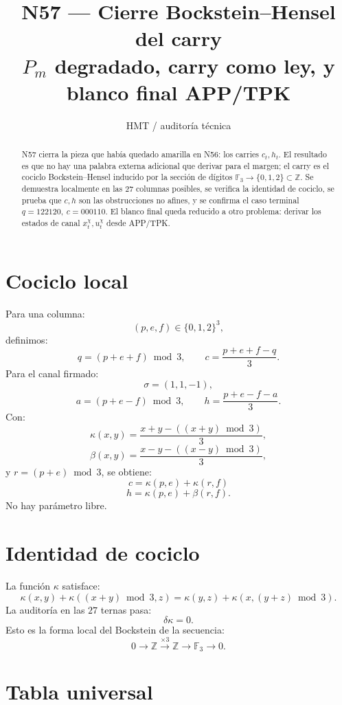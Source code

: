 \documentclass[11pt,a4paper]{article}
\title{\bfseries N57 --- Cierre Bockstein--Hensel del carry\\
\large \(P_m\) degradado, carry como ley, y blanco final APP/TPK}
\author{HMT / auditoría técnica}
\date{}
\begin{document}
\maketitle

\begin{abstract}
N57 cierra la pieza que había quedado amarilla en N56: los carries \(c_t,h_t\). El resultado es que no hay una palabra externa adicional que derivar para el margen; el carry es el cociclo Bockstein--Hensel inducido por la sección de dígitos \(\mathbb F_3\to\{0,1,2\}\subset\mathbb Z\). Se demuestra localmente en las \(27\) columnas posibles, se verifica la identidad de cociclo, se prueba que \(c,h\) son las obstrucciones no afines, y se confirma el caso terminal \(q=122120,\ c=000110\). El blanco final queda reducido a otro problema: derivar los estados de canal \(x_t^\chi,u_t^\chi\) desde APP/TPK.
\end{abstract}

\section{Cociclo local}

Para una columna:
\[
(p,e,f)\in\{0,1,2\}^3,
\]
definimos:
\[
q=(p+e+f)\bmod3,
\qquad
c=\frac{p+e+f-q}{3}.
\]
Para el canal firmado:
\[
\sigma=(1,1,-1),
\]
\[
a=(p+e-f)\bmod3,
\qquad
h=\frac{p+e-f-a}{3}.
\]
Con:
\[
\kappa(x,y)=\frac{x+y-((x+y)\bmod3)}{3},
\]
\[
\beta(x,y)=\frac{x-y-((x-y)\bmod3)}{3},
\]
y \(r=(p+e)\bmod3\), se obtiene:
\[
\boxed{
c=\kappa(p,e)+\kappa(r,f)
}
\]
\[
\boxed{
h=\kappa(p,e)+\beta(r,f).
}
\]
No hay parámetro libre.

\section{Identidad de cociclo}

La función \(\kappa\) satisface:
\[
\kappa(x,y)+\kappa((x+y)\bmod3,z)
=
\kappa(y,z)+\kappa(x,(y+z)\bmod3).
\]
La auditoría en las \(27\) ternas pasa:
\[
\boxed{
\delta\kappa=0.
}
\]
Esto es la forma local del Bockstein de la secuencia:
\[
0\to\mathbb Z\xrightarrow{\times3}\mathbb Z\to\mathbb F_3\to0.
\]

\section{Tabla universal}
\end{document}
